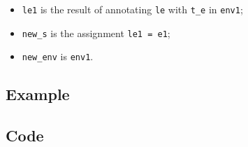 \documentclass{book}
\begin{document}
\begin{itemize}
\begin{itemize}
\begin{itemize}
       \item \texttt{le1} is the result of annotating \texttt{le} with \texttt{t\_e} in \texttt{env1};
       \item \texttt{new\_s} is the assignment \texttt{le1 = e1};
       \item \texttt{new\_env} is \texttt{env1}.
       \end{itemize}
    \end{itemize}
  \end{itemize}

  \subsection{Example}

  \subsection{Code}
\end{document}
